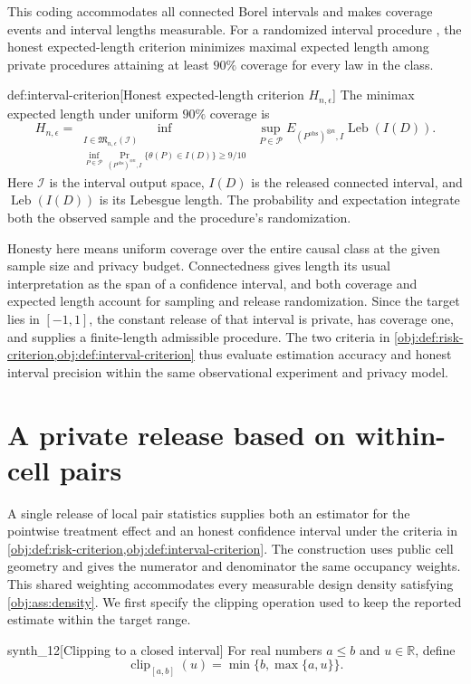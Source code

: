 \documentclass[11pt]{article}
\begin{document}
This coding accommodates all connected Borel intervals and makes coverage events and interval lengths measurable. For a randomized interval procedure , the honest expected-length criterion  minimizes maximal expected length among private procedures attaining at least \(90\%\) coverage for every law in the class.

\begin{definitionv}{def:interval-criterion}[Honest expected-length criterion \(H_{n,\epsilon}\)]
The minimax expected length under uniform \(90\%\) coverage is
\[
H_{n,\epsilon}
=
\inf_{\substack{
I\in\mathfrak M_{n,\epsilon}(\mathcal I)\\
\inf_{P\in\mathcal P}
\Pr_{(P^{\mathrm{obs}})^{\otimes n},I}
\{\theta(P)\in I(D)\}\ge 9/10
}}
\ \sup_{P\in\mathcal P}
E_{(P^{\mathrm{obs}})^{\otimes n},I}
\operatorname{Leb}(I(D)).
\]
Here \(\mathcal I\) is the interval output space, \(I(D)\) is the released connected interval, and \(\operatorname{Leb}(I(D))\) is its Lebesgue length. The probability and expectation integrate both the observed sample and the procedure's randomization.
\end{definitionv}

Honesty here means uniform coverage over the entire causal class at the given sample size and privacy budget. Connectedness gives length its usual interpretation as the span of a confidence interval, and both coverage and expected length account for sampling and release randomization. Since the target lies in \([-1,1]\), the constant release of that interval is private, has coverage one, and supplies a finite-length admissible procedure. The two criteria in \cref{obj:def:risk-criterion,obj:def:interval-criterion} thus evaluate estimation accuracy and honest interval precision within the same observational experiment and privacy model.


\section{A private release based on within-cell pairs}

A single release of local pair statistics supplies both an estimator for the pointwise treatment effect and an honest confidence interval under the criteria in \cref{obj:def:risk-criterion,obj:def:interval-criterion}. The construction uses public cell geometry and gives the numerator and denominator the same occupancy weights. This shared weighting accommodates every measurable design density satisfying \cref{obj:ass:density}. We first specify the clipping operation used to keep the reported estimate within the target range.
\begin{definitionv}{synth_12}[Clipping to a closed interval]
For real numbers \(a\le b\) and \(u\in\mathbb R\), define
\[
\operatorname{clip}_{[a,b]}(u)=\min\{b,\max\{a,u\}\}.
\]
\end{definitionv}
\end{document}
